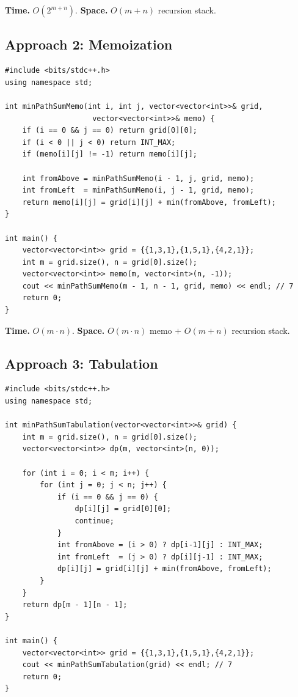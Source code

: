\begin{complexitybox}
\textbf{Time.} $O(2^{m+n})$.
\textbf{Space.} $O(m+n)$ recursion stack.
\end{complexitybox}

\subsection*{Approach 2: Memoization}

\begin{lstlisting}
#include <bits/stdc++.h>
using namespace std;

int minPathSumMemo(int i, int j, vector<vector<int>>& grid,
                    vector<vector<int>>& memo) {
    if (i == 0 && j == 0) return grid[0][0];
    if (i < 0 || j < 0) return INT_MAX;
    if (memo[i][j] != -1) return memo[i][j];

    int fromAbove = minPathSumMemo(i - 1, j, grid, memo);
    int fromLeft  = minPathSumMemo(i, j - 1, grid, memo);
    return memo[i][j] = grid[i][j] + min(fromAbove, fromLeft);
}

int main() {
    vector<vector<int>> grid = {{1,3,1},{1,5,1},{4,2,1}};
    int m = grid.size(), n = grid[0].size();
    vector<vector<int>> memo(m, vector<int>(n, -1));
    cout << minPathSumMemo(m - 1, n - 1, grid, memo) << endl; // 7
    return 0;
}
\end{lstlisting}

\begin{complexitybox}
\textbf{Time.} $O(m \cdot n)$.
\textbf{Space.} $O(m \cdot n)$ memo $+$ $O(m+n)$ recursion stack.
\end{complexitybox}

\subsection*{Approach 3: Tabulation}

\begin{lstlisting}
#include <bits/stdc++.h>
using namespace std;

int minPathSumTabulation(vector<vector<int>>& grid) {
    int m = grid.size(), n = grid[0].size();
    vector<vector<int>> dp(m, vector<int>(n, 0));

    for (int i = 0; i < m; i++) {
        for (int j = 0; j < n; j++) {
            if (i == 0 && j == 0) {
                dp[i][j] = grid[0][0];
                continue;
            }
            int fromAbove = (i > 0) ? dp[i-1][j] : INT_MAX;
            int fromLeft  = (j > 0) ? dp[i][j-1] : INT_MAX;
            dp[i][j] = grid[i][j] + min(fromAbove, fromLeft);
        }
    }
    return dp[m - 1][n - 1];
}

int main() {
    vector<vector<int>> grid = {{1,3,1},{1,5,1},{4,2,1}};
    cout << minPathSumTabulation(grid) << endl; // 7
    return 0;
}
\end{lstlisting}


